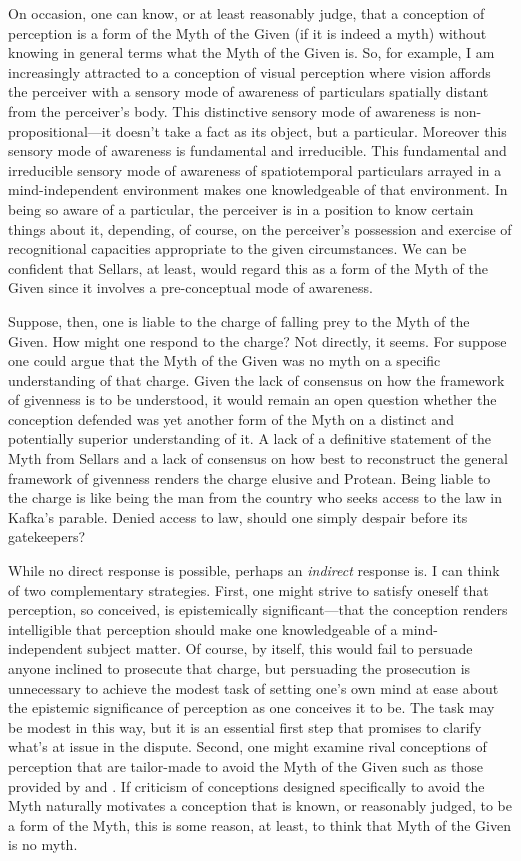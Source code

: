 \documentclass[12pt]{article}
\begin{document}
On occasion, one can know, or at least reasonably judge, that a conception of perception is a form of the Myth of the Given (if it is indeed a myth) without knowing in general terms what the Myth of the Given is. So, for example, I am increasingly attracted to a conception of visual perception where vision affords the perceiver with a sensory mode of awareness of particulars spatially distant from the perceiver's body. This distinctive sensory mode of awareness is non-propositional---\-it doesn't take a fact as its object, but a particular. Moreover this sensory mode of awareness is fundamental and irreducible. This fundamental and irreducible sensory mode of awareness of spatiotemporal particulars arrayed in a mind-independent environment makes one knowledgeable of that environment. In being so aware of a particular, the perceiver is in a position to know certain things about it, depending, of course, on the perceiver's possession and exercise of recognitional capacities appropriate to the given circumstances. We can be confident that Sellars, at least, would regard this as a form of the Myth of the Given since it involves a pre-conceptual mode of awareness.

Suppose, then, one is liable to the charge of falling prey to the Myth of the Given. How might one respond to the charge? Not directly, it seems. For suppose one could argue that the Myth of the Given was no myth on a specific understanding of that charge. Given the lack of consensus on how the framework of givenness is to be understood, it would remain an open question whether the conception defended was yet another form of the Myth on a distinct and potentially superior understanding of it. A lack of a definitive statement of the Myth from Sellars and a lack of consensus on how best to reconstruct the general framework of givenness renders the charge elusive and Protean. Being liable to the charge is like being the man from the country who seeks access to the law in Kafka's parable. Denied access to law, should one simply despair before its gatekeepers?

While no direct response is possible, perhaps an \emph{indirect} response is. I can think of two complementary strategies. First, one might strive to satisfy oneself that perception, so conceived, is epistemically significant---that the conception renders intelligible that perception should make one knowledgeable of a mind-independent subject matter. Of course, by itself, this would fail to persuade anyone inclined to prosecute that charge, but persuading the prosecution is unnecessary to achieve the modest task of setting one's own mind at ease about the epistemic significance of perception as one conceives it to be. The task may be modest in this way, but it is an essential first step that promises to clarify what's at issue in the dispute. Second, one might examine rival conceptions of perception that are tailor-made to avoid the Myth of the Given such as those provided by \citet{Sellars:1956xp} and \citet{McDowell:1996uq,McDowell:1998vn,McDowell:2008fk}. If criticism of conceptions designed specifically to avoid the Myth naturally motivates a conception that is known, or reasonably judged, to be a form of the Myth, this is some reason, at least, to think that Myth of the Given is no myth. 
\end{document}
